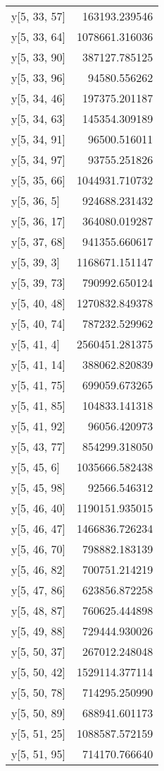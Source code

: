 \begin{longtable}{lr}
y[5, 33, 57] & 163193.239546 \\
y[5, 33, 64] & 1078661.316036 \\
y[5, 33, 90] & 387127.785125 \\
y[5, 33, 96] & 94580.556262 \\
y[5, 34, 46] & 197375.201187 \\
y[5, 34, 63] & 145354.309189 \\
y[5, 34, 91] & 96500.516011 \\
y[5, 34, 97] & 93755.251826 \\
y[5, 35, 66] & 1044931.710732 \\
y[5, 36, 5] & 924688.231432 \\
y[5, 36, 17] & 364080.019287 \\
y[5, 37, 68] & 941355.660617 \\
y[5, 39, 3] & 1168671.151147 \\
y[5, 39, 73] & 790992.650124 \\
y[5, 40, 48] & 1270832.849378 \\
y[5, 40, 74] & 787232.529962 \\
y[5, 41, 4] & 2560451.281375 \\
y[5, 41, 14] & 388062.820839 \\
y[5, 41, 75] & 699059.673265 \\
y[5, 41, 85] & 104833.141318 \\
y[5, 41, 92] & 96056.420973 \\
y[5, 43, 77] & 854299.318050 \\
y[5, 45, 6] & 1035666.582438 \\
y[5, 45, 98] & 92566.546312 \\
y[5, 46, 40] & 1190151.935015 \\
y[5, 46, 47] & 1466836.726234 \\
y[5, 46, 70] & 798882.183139 \\
y[5, 46, 82] & 700751.214219 \\
y[5, 47, 86] & 623856.872258 \\
y[5, 48, 87] & 760625.444898 \\
y[5, 49, 88] & 729444.930026 \\
y[5, 50, 37] & 267012.248048 \\
y[5, 50, 42] & 1529114.377114 \\
y[5, 50, 78] & 714295.250990 \\
y[5, 50, 89] & 688941.601173 \\
y[5, 51, 25] & 1088587.572159 \\
y[5, 51, 95] & 714170.766640 \\

\end{longtable}
